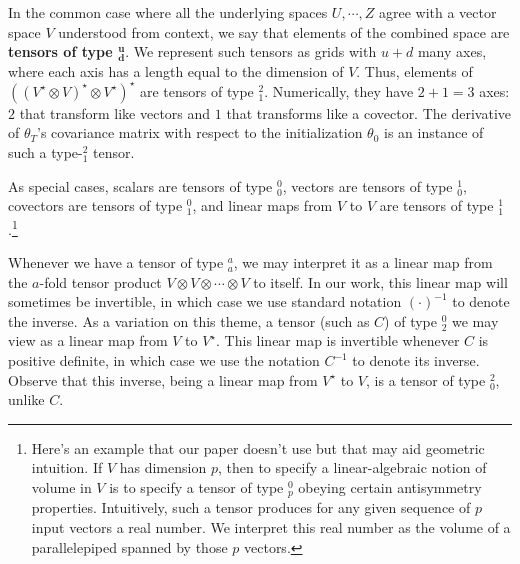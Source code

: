 \documentclass[anon,12pt]{colt2021} %
\begin{document}
{            In the common case where all the underlying spaces $U,\cdots, Z$
            agree with a vector space $V$ understood from
            context, we say that elements of the combined space are
            \textbf{tensors of type $\mathbf{^u_d}$}.  We represent such
            tensors as grids with $u+d$ many axes, where each axis has a length
            equal to the dimension of $V$.
            Thus, elements of $((V^\star \otimes V)^\star \otimes
            V^\star)^\star$ are tensors of type $^2_1$.  Numerically, they have
            $2+1=3$ axes: $2$ that transform like vectors and $1$ that
            transforms like a covector.  
            The derivative of $\theta_T$'s covariance matrix with respect to
            the initialization $\theta_0$ is an instance of such a type-$^2_1$
            tensor.

            As special cases, scalars are tensors of type $^0_0$,
            vectors are tensors of type $^1_0$, covectors are tensors of
            type $^0_1$, and linear maps from $V$ to $V$ are tensors of type
            $^1_1$.\footnote{
                Here's an example that our paper doesn't use but that may
                aid geometric intuition.
                If $V$ has dimension $p$, then to specify a linear-algebraic
                notion of volume in $V$ is to specify a tensor of type $^0_p$
                obeying certain antisymmetry properties.
                Intuitively, such a tensor produces for any given sequence
                of $p$ input vectors a real number.  We interpret this real
                number as the volume of a parallelepiped spanned by those $p$
                vectors.
            }

            Whenever we have a tensor of type $^a_a$, we may interpret it as a
            linear map from the $a$-fold tensor product $V\otimes
            V\otimes\cdots\otimes V$ to itself.  In our work, this linear map  
            will sometimes be invertible, in which case we use standard notation
            $(\cdot)^{-1}$ to denote the inverse.
            As a variation on this theme, a tensor (such as $C$) of type
            $^0_2$ we may view as a linear map from $V$ to $V^\star$.
            This linear map  
            is invertible whenever $C$ is positive definite, in which case
            we use the notation $C^{-1}$ to denote its inverse.  Observe that
            this inverse, being a linear map from $V^\star$ to $V$, is a tensor
            of type $^2_0$, unlike $C$.

}
\end{document}
